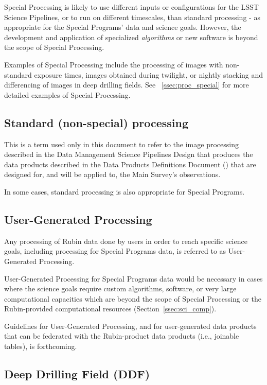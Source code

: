 Special Processing is likely to use different inputs or configurations for the
LSST Science Pipelines, or to run on different timescales, than standard processing - 
as appropriate for the Special Programs' data and science goals.
However, the development and application of specialized \emph{algorithms} or new software
is beyond the scope of Special Processing.

Examples of Special Processing include the processing
of images with non-standard exposure times, images obtained
during twilight, or nightly stacking and differencing
of images in deep drilling fields.
See \Section~\ref{ssec:proc_special} for more detailed examples of Special Processing.

\subsection{Standard (non-special) processing}\label{ssec:intro_stdproc}

This is a term used only in this document to refer to the image processing 
described in the Data Management Science Pipelines Design  that produces the data products described in the Data Products Definitions Document
() that are designed for, and will be applied to, the Main Survey's observations.

In some cases, standard processing is also appropriate for Special Programs.


\subsection{User-Generated Processing}

Any processing of Rubin data done by users in order to reach specific science goals, including
processing for Special Programs data, is referred to as User-Generated Processing.

User-Generated Processing for Special Programs data would be necessary in cases where
the science goals require custom algorithms, software, or very large computational
capacities which are beyond the scope of Special Processing or the Rubin-provided
computational resources (Section~\ref{ssec:sci_comp}).

Guidelines for User-Generated Processing, and for user-generated data products
that can be federated with the Rubin-product data products (i.e., joinable tables),
is forthcoming.

\subsection{Deep Drilling Field (DDF)}

